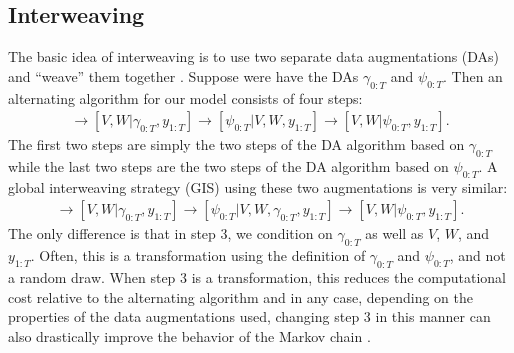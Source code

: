 \documentclass[graybox]{svmult}
\begin{document}
\subsection{Interweaving}\label{sec:inter}
The basic idea of interweaving is to use two separate data augmentations (DAs) and ``weave'' them together \citep{yu2011center}. Suppose were have the DAs $\gamma_{0:T}$ and $\psi_{0:T}$. Then an alternating algorithm for our model consists of four steps:
\begin{align*}
[\gamma_{0:T}|V,W,y_{1:T}] \to [V,W|\gamma_{0:T},y_{1:T}] \to [\psi_{0:T}|V,W,y_{1:T}] \to [V,W|\psi_{0:T},y_{1:T}].
\end{align*}
The first two steps are simply the two steps of the DA algorithm based on $\gamma_{0:T}$ while the last two steps are the two steps of the DA algorithm based on $\psi_{0:T}$. A global interweaving strategy (GIS) using these two augmentations is very similar:
\begin{align*}
[\gamma_{0:T}|V,W,y_{1:T}] \to [V,W|\gamma_{0:T},y_{1:T}] \to [\psi_{0:T}|V,W,\gamma_{0:T},y_{1:T}] \to [V,W|\psi_{0:T},y_{1:T}].
\end{align*}
The only difference is that in step 3, we condition on $\gamma_{0:T}$ as well as $V$, $W$, and $y_{1:T}$. Often, this is a transformation using the definition of $\gamma_{0:T}$ and $\psi_{0:T}$, and not a random draw. When step 3 is a transformation, this reduces the computational cost relative to the alternating algorithm and in any case, depending on the properties of the data augmentations used, changing step 3 in this manner can also drastically improve the behavior of the Markov chain \citep{yu2011center}.
\end{document}
